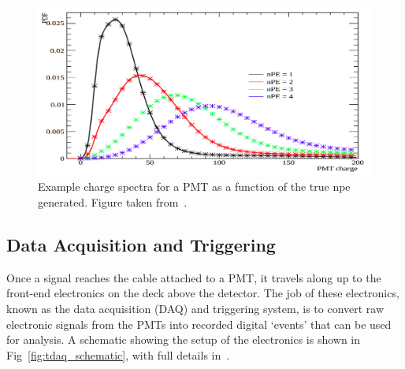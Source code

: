 \begin{figure}
    \centering
    \includegraphics[width=0.8\linewidth]{2_Detector/Figs/charge_spectra_mod.png}
    \caption[Example charge spectra for a PMT as a function of the true npe generated]{Example charge spectra for a PMT as a function of the true npe generated. Figure taken from~\cite{dungerOccupancyAnalysisMultipleHit2016}. %
    }
    \label{fig:charge_dists_pmt}
\end{figure}


\subsection{Data Acquisition and Triggering}\label{sec:daq}
Once a signal reaches the cable attached to a PMT, it travels along up to the front-end electronics on the deck above the detector. The job of these electronics, known as the data acquisition (DAQ) and triggering system, is to convert raw electronic signals from the PMTs into recorded digital `events' that can be used for analysis. A schematic showing the setup of the electronics is shown in Fig~\ref{fig:tdaq_schematic}, with full details in~\cite{albaneseSNOExperiment2021}. %

